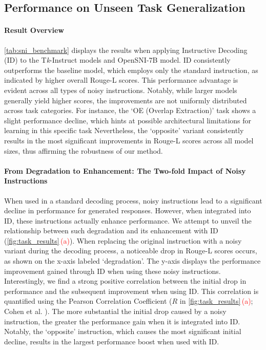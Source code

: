 \vspace{-5pt}
\subsection{Performance on Unseen Task Generalization}
\vspace{-5pt}
\paragraph{Result Overview}


\autoref{tab:sni_benchmark} displays the results when applying Instructive Decoding (ID) to the T\textit{k}-Instruct models and OpenSNI-7B model. ID consistently outperforms the baseline model, which employs only the standard instruction, as indicated by higher overall Rouge-L scores. This performance advantage is evident across all types of noisy instructions. Notably, while larger models generally yield higher scores, the improvements are not uniformly distributed across task categories. For instance, the `OE (Overlap Extraction)' task shows a slight performance decline, which hints at possible architectural limitations for learning in this specific task  Nevertheless, the `opposite' variant consistently results in the most significant improvements in Rouge-L scores across all model sizes, thus affirming the robustness of our method.

\vspace{-5pt}
\paragraph{From Degradation to Enhancement: The Two-fold Impact of Noisy Instructions}

When used in a standard decoding process, noisy instructions lead to a significant decline in performance for generated responses. However, when integrated into ID, these instructions actually enhance performance. We attempt to unveil the relationship between such degradation and its enhancement with ID (\autoref{fig:task_results}\,\textcolor{red}{(a)}). When replacing the original instruction with a noisy variant during the decoding process, a noticeable drop in Rouge-L scores occurs, as shown on the x-axis labeled `degradation'. The y-axis displays the performance improvement gained through ID when using these noisy instructions. Interestingly, we find a strong positive correlation between the initial drop in performance and the subsequent improvement when using ID. This correlation is quantified using the Pearson Correlation Coefficient ($R$ in \autoref{fig:task_results}\,\textcolor{red}{(a)}; Cohen et al. \citep{cohen2009pearson}). The more substantial the initial drop caused by a noisy instruction, the greater the performance gain when it is integrated into ID. Notably, the `opposite' instruction, which causes the most significant initial decline, results in the largest performance boost when used with ID.

